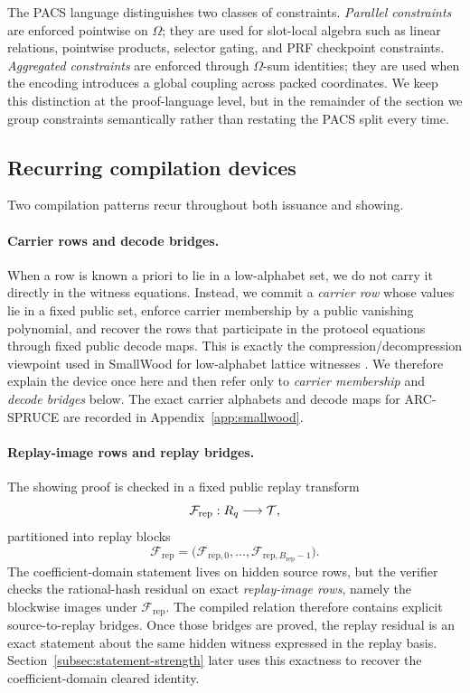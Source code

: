 The PACS language distinguishes two classes of constraints. \emph{Parallel constraints} are enforced pointwise on
\(\Omega\); they are used for slot-local algebra such as linear relations, pointwise products, selector gating, and PRF
checkpoint constraints. \emph{Aggregated constraints} are enforced through \(\Omega\)-sum identities; they are used when
the encoding introduces a global coupling across packed coordinates. We keep this distinction at the proof-language level,
but in the remainder of the section we group constraints semantically rather than restating the PACS split every time.

\subsection{Recurring compilation devices}
\label{subsec:compilation-devices}
\label{subsec:abstract-compiled}
Two compilation patterns recur throughout both issuance and showing.

\paragraph{Carrier rows and decode bridges.}
When a row is known a priori to lie in a low-alphabet set, we do not carry it directly in the witness equations.
Instead, we commit a \emph{carrier row} whose values lie in a fixed public set, enforce carrier membership by a public
vanishing polynomial, and recover the rows that participate in the protocol equations through fixed public decode maps.
This is exactly the compression/decompression viewpoint used in SmallWood for low-alphabet lattice witnesses
\cite[Section~6]{EPRINT:FenRiv25b}. We therefore explain the device once here and then refer only to \emph{carrier
membership} and \emph{decode bridges} below. The exact carrier alphabets and decode maps for ARC-SPRUCE are recorded in
Appendix~\ref{app:smallwood}.

\paragraph{Replay-image rows and replay bridges.}
The showing proof is checked in a fixed public replay transform
\[
\mathcal F_{\mathrm{rep}} : R_q \longrightarrow \mathcal T,
\]
partitioned into replay blocks
\[
\mathcal F_{\mathrm{rep}} = \bigl(\mathcal F_{\mathrm{rep},0},\ldots,\mathcal F_{\mathrm{rep},B_{\mathrm{rep}}-1}\bigr).
\]
The coefficient-domain statement lives on hidden source rows, but the verifier checks the rational-hash residual on exact
\emph{replay-image rows}, namely the blockwise images under \(\mathcal F_{\mathrm{rep}}\). The compiled relation
therefore contains explicit source-to-replay bridges. Once those bridges are proved, the replay residual is an exact
statement about the same hidden witness expressed in the replay basis. Section~\ref{subsec:statement-strength} later uses
this exactness to recover the coefficient-domain cleared identity.

